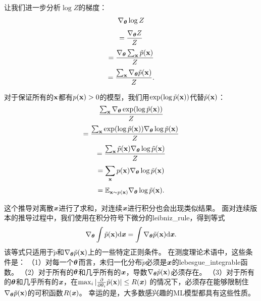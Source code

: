 让我们进一步分析$\log Z$的梯度：
\begin{equation}
	\nabla_{\boldsymbol{\theta}} \log Z
\end{equation}
\begin{equation}
	= \frac{ \nabla_{\boldsymbol{\theta}} Z }{Z}
\end{equation}
\begin{equation}
	= \frac{ \nabla_{\boldsymbol{\theta}} \sum_{\mathbf{x}} \tilde{p}(\mathbf{x}) }{Z}
\end{equation}
\begin{equation}
	= \frac{ \sum_{\mathbf{x}} \nabla_{\boldsymbol{\theta}} \tilde{p}(\mathbf{x}) }{Z}.
\end{equation}


对于保证所有的$\mathbf{x}$都有$p(\mathbf{x}) > 0$的模型，我们用$\exp(\log \tilde{p}(\mathbf{x}))$代替$\tilde{p}(\mathbf{x})$：
\begin{equation}
	\frac{ \sum_{\mathbf{x}} \nabla_{\boldsymbol{\theta}} \exp (\log \tilde{p} (\mathbf{x})) }{ Z }
\end{equation}
\begin{equation}
	= \frac{  \sum_{\mathbf{x}}  \exp (\log \tilde{p} (\mathbf{x})) \nabla_{\boldsymbol{\theta}} \log \tilde{p}(\mathbf{x})  }{Z}
\end{equation}
\begin{equation}
	=\frac{  \sum_{\mathbf{x}} \tilde{p} (\mathbf{x})  \nabla_{\boldsymbol{\theta}} \log \tilde{p}(\mathbf{x})  }{ Z}
\end{equation}
\begin{equation}
	=\sum_{\mathbf{x}} p(\mathbf{x}) \nabla_{\boldsymbol{\theta}} \log \tilde{p} ( \mathbf{x} )
 \end{equation}
\begin{equation}
	=\mathbb{E}_{\mathbf{x} \sim p(\mathbf{x})} \nabla_{\boldsymbol{\theta}} \log \tilde{p} (\mathbf{x}).
\end{equation}


这个推导对离散$\boldsymbol{\mathit{x}}$进行了求和，对连续$\boldsymbol{\mathit{x}}$进行积分也会出现类似结果。
面对连续版本的推导过程中，我们使用在积分符号下微分的\gls{leibniz_rule}，得到等式
\begin{equation}
	\nabla_{\boldsymbol{\theta}} \int \tilde{p} (\mathbf{x}) \mathrm{d} \boldsymbol{\mathit{x}}  = \int \nabla_{\boldsymbol{\theta}} 
\tilde{p} (\mathbf{x}) \mathrm{d} \boldsymbol{\mathit{x}}.
\end{equation}
该等式只适用于$\tilde{p}$和$\nabla_{\boldsymbol{\theta}} \tilde{p} (\mathbf{x})$上的一些特定正则条件。
在测度理论术语中，这些条件是：
（1）对每一个$\boldsymbol{\theta}$而言，未归一化分布$\tilde{p}$必须是$\boldsymbol{\mathit{x}}$的\gls{lebesgue_integrable}函数。
（2）对于所有的$\boldsymbol{\theta}$和几乎所有的$\boldsymbol{\mathit{x}}$，导数$\nabla_{\boldsymbol{\theta}} \tilde{p}(\mathbf{x})$必须存在。
（3）对于所有的$\boldsymbol{\theta}$和几乎所有的$\boldsymbol{\mathit{x}}$，在$\max_i | \frac{\partial}{\partial \theta_i } \tilde{p} (\mathbf{x}) | \leq R(\boldsymbol{\mathit{x}})$ 的情况下，必须存在能够限制住$\nabla_{\boldsymbol{\theta}} \tilde{p}(\mathbf{x})$的可积函数$R(\boldsymbol{\mathit{x}})$。
幸运的是，大多数感兴趣的\gls{ML}模型都具有这些性质。



